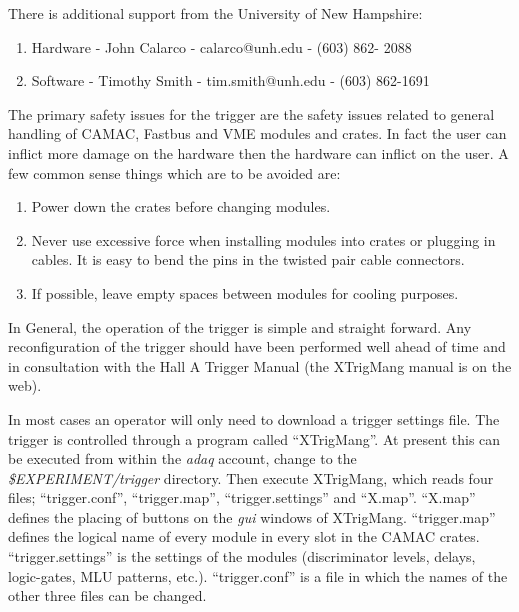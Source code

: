 \noindent There is additional support from the University of New Hampshire:

\begin{enumerate}

	\item Hardware - John Calarco - calarco@unh.edu - (603) 862- 2088

	\item Software - Timothy Smith - tim.smith@unh.edu - (603) 862-1691

\end{enumerate}



	The primary safety issues for the trigger are the safety issues related to general handling of CAMAC, Fastbus and VME modules and crates.  In fact the user can inflict more damage on the hardware then the hardware can inflict on the user.  A few common sense things which are to be avoided are:  

\begin{enumerate}

	\item Power down the crates before changing modules.

	\item Never use excessive force when installing modules into crates or plugging in cables. It is easy to bend the pins in the twisted pair cable connectors.

	\item If possible,  leave empty spaces between modules for cooling purposes. 

\end{enumerate}
	


	In General,  the operation of the trigger is simple and straight forward.  Any reconfiguration of the trigger should have been performed well ahead of time and in consultation with the Hall A Trigger Manual (the XTrigMang manual is on the web).
	
	In most cases an operator will only need to download a trigger settings file.  The trigger is controlled through a program called ``XTrigMang''.  At present this can be executed from within the
{\sl adaq} account, change to the {\sl \$EXPERIMENT/trigger} directory. Then execute XTrigMang, which reads four files;  ``trigger.conf'', ``trigger.map'', ``trigger.settings'' and ``X.map''.  ``X.map'' defines the placing of buttons on the {\sl gui} windows of XTrigMang.  ``trigger.map'' defines the logical name of every module in every slot in the CAMAC crates.  ``trigger.settings'' is the settings of the modules (discriminator levels, delays, logic-gates, MLU patterns, etc.).  ``trigger.conf'' is a file in which the names of the other three files can be changed.

